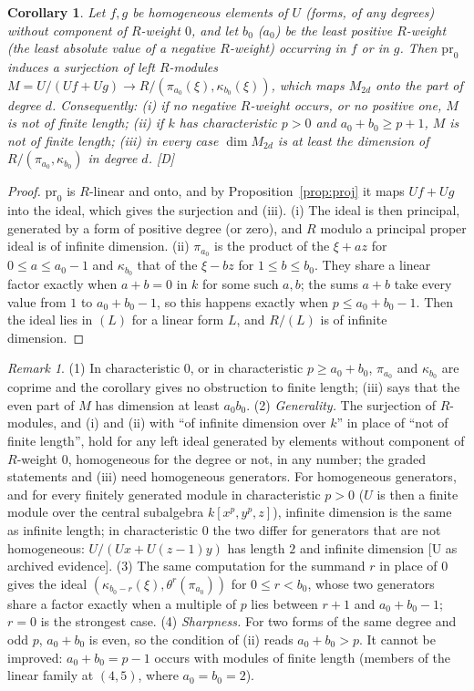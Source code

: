 \documentclass[11pt]{article}
\newtheorem{corollary}{Corollary}
\theoremstyle{definition}
\theoremstyle{remark}
\newtheorem{remark}{Remark}
\begin{document}
\begin{corollary}\label{cor:proj}
Let $f,g$ be homogeneous elements of $U$ (forms, of any degrees) without component of $R$-weight $0$, and let $b_0$ ($a_0$) be the least positive $R$-weight (the least absolute value of a negative $R$-weight) occurring in $f$ or in $g$. Then $\mathrm{pr}_0$ induces a surjection of left $R$-modules $M=U/(Uf+Ug)\to R/(\pi_{a_0}(\xi),\kappa_{b_0}(\xi))$, which maps $M_{2d}$ onto the part of degree $d$. Consequently: (i) if no negative $R$-weight occurs, or no positive one, $M$ is not of finite length; (ii) if $k$ has characteristic $p>0$ and $a_0+b_0\ge p+1$, $M$ is not of finite length; (iii) in every case $\dim M_{2d}$ is at least the dimension of $R/(\pi_{a_0},\kappa_{b_0})$ in degree $d$. [D]
\end{corollary}
\begin{proof}
$\mathrm{pr}_0$ is $R$-linear and onto, and by Proposition~\ref{prop:proj} it maps $Uf+Ug$ into the ideal, which gives the surjection and (iii). (i) The ideal is then principal, generated by a form of positive degree (or zero), and $R$ modulo a principal proper ideal is of infinite dimension. (ii) $\pi_{a_0}$ is the product of the $\xi+az$ for $0\le a\le a_0-1$ and $\kappa_{b_0}$ that of the $\xi-bz$ for $1\le b\le b_0$. They share a linear factor exactly when $a+b=0$ in $k$ for some such $a,b$; the sums $a+b$ take every value from $1$ to $a_0+b_0-1$, so this happens exactly when $p\le a_0+b_0-1$. Then the ideal lies in $(L)$ for a linear form $L$, and $R/(L)$ is of infinite dimension.
\end{proof}

\begin{remark}\label{rem:proj}
(1) In characteristic $0$, or in characteristic $p\ge a_0+b_0$, $\pi_{a_0}$ and $\kappa_{b_0}$ are coprime and the corollary gives no obstruction to finite length; (iii) says that the even part of $M$ has dimension at least $a_0b_0$. (2) \emph{Generality.} The surjection of $R$-modules, and (i) and (ii) with ``of infinite dimension over $k$'' in place of ``not of finite length'', hold for any left ideal generated by elements without component of $R$-weight $0$, homogeneous for the degree or not, in any number; the graded statements and (iii) need homogeneous generators. For homogeneous generators, and for every finitely generated module in characteristic $p>0$ ($U$ is then a finite module over the central subalgebra $k[x^p,y^p,z]$), infinite dimension is the same as infinite length; in characteristic $0$ the two differ for generators that are not homogeneous: $U/(Ux+U(z-1)y)$ has length $2$ and infinite dimension [U as archived evidence]. (3) The same computation for the summand $r$ in place of $0$ gives the ideal $(\kappa_{b_0-r}(\xi),\theta^r(\pi_{a_0}))$ for $0\le r<b_0$, whose two generators share a factor exactly when a multiple of $p$ lies between $r+1$ and $a_0+b_0-1$; $r=0$ is the strongest case. (4) \emph{Sharpness.} For two forms of the same degree and odd $p$, $a_0+b_0$ is even, so the condition of (ii) reads $a_0+b_0>p$. It cannot be improved: $a_0+b_0=p-1$ occurs with modules of finite length (members of the linear family at $(4,5)$, where $a_0=b_0=2$).
\end{remark}
\end{document}
